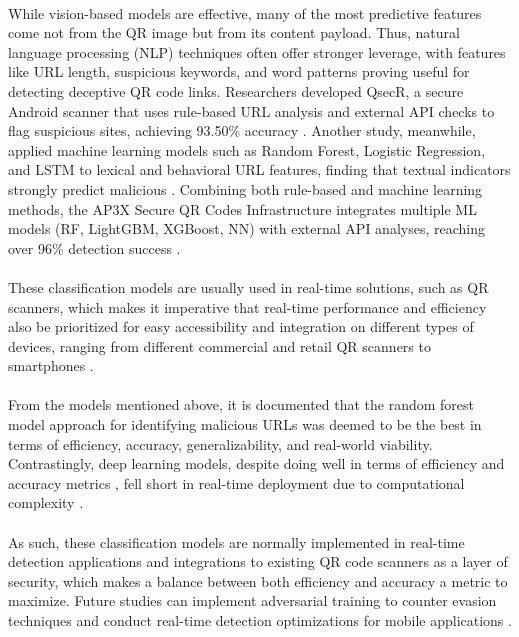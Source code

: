 \documentclass[a4paper]{scl-article}
\begin{document}
\paragraph{}While vision-based models are effective, many of the most predictive features come not from the QR image but from its content payload. Thus, natural language processing (NLP) techniques often offer stronger leverage, with features like URL length, suspicious keywords, and word patterns proving useful for detecting deceptive QR code links. Researchers developed QsecR, a secure Android scanner that uses rule-based URL analysis and external API checks to flag suspicious sites, achieving 93.50\% accuracy \cite{rafsanjani2023}. Another study, meanwhile, applied machine learning models such as Random Forest, Logistic Regression, and LSTM to lexical and behavioral URL features, finding that textual indicators strongly predict malicious \cite{tayachi2025}. Combining both rule-based and machine learning methods, the AP3X Secure QR Codes Infrastructure integrates multiple ML models (RF, LightGBM, XGBoost, NN) with external API analyses, reaching over 96\% detection success \cite{rivas2025}. 
 


\paragraph{}These classification models are usually used in real-time solutions, such as QR scanners, which makes it imperative that real-time performance and efficiency also be prioritized for easy accessibility and integration on different types of devices, ranging from different commercial and retail QR scanners to smartphones \cite{rafsanjani2023}.

\paragraph{}From the models mentioned above, it is documented that the random forest model approach for identifying malicious URLs was deemed to be the best in terms of efficiency, accuracy, generalizability, and real-world viability. Contrastingly, deep learning models, despite doing well in terms of efficiency and accuracy metrics \cite{lourenco2023}, fell short in real-time deployment due to computational complexity \cite{tayachi2025}. 

\paragraph{}As such, these classification models are normally implemented in real-time detection applications \cite{rafsanjani2023} and integrations to existing QR code scanners as a layer of security, which makes a balance between both efficiency and accuracy a metric to maximize. Future studies can implement adversarial training to counter evasion techniques and conduct real-time detection optimizations for mobile applications \cite{tayachi2025}. 
\end{document}
